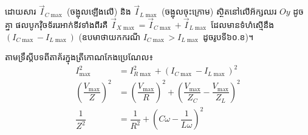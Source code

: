\vspace{0.2em}
\noindent
\begin{minipage}[c]{0.56\textwidth}
	\vspace{0pt}
	\raggedright
	ដោយសារ $\vec{I}_{C\max}$ (ចង្អុលឡើងលើ) និង $\vec{I}_{L\max}$ (ចង្អុលចុះក្រោម) ស្ថិតនៅលើអ័ក្សឈរ $Oy$ ដូចគ្នា ផលបូកវ៉ិចទ័ររេអាក់ទីវទាំងពីរគឺ $\vec{I}_{X\max} = \vec{I}_{C\max} + \vec{I}_{L\max}$ ដែលមានទំហំស្មើនឹង $(I_{C\max} - I_{L\max})$ (ឧបមាថាយកករណី $I_{C\max} > I_{L\max}$ ដូចរូបទី៦០.ខ)។

	\vspace{0.3em}
	តាមទ្រឹស្តីបទពីតាគ័រក្នុងត្រីកោណកែងប្រេណែល៖
	\begin{align*}
		I_{\max}^2 &= I_{R\max}^2 + (I_{C\max} - I_{L\max})^2 \\
		\left(\dfrac{V_{\max}}{Z}\right)^2 &= \left(\dfrac{V_{\max}}{R}\right)^2 + \left(\dfrac{V_{\max}}{Z_C} - \dfrac{V_{\max}}{Z_L}\right)^2 \\
		\dfrac{1}{Z^2} &= \dfrac{1}{R^2} + \left(C\omega - \dfrac{1}{L\omega}\right)^2
	\end{align*}
\end{minipage}%
\hfill
